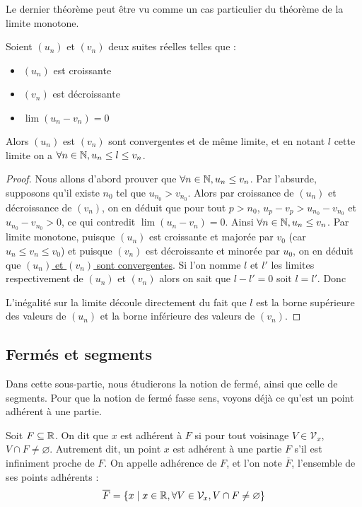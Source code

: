 Le dernier théorème peut être vu comme un cas particulier du théorème de la limite monotone.

\begin{them}
    Soient $(u_n)$ et $(v_n)$ deux suites réelles telles que :
    \begin{itemize}[label=$\bullet$]
        \item $(u_n)$ est croissante
        \item $(v_n)$ est décroissante
        \item $\lim (u_n-v_n) = 0$
    \end{itemize}
    Alors $(u_n)$ est $(v_n)$ sont convergentes et de même limite, et en notant $l$ cette limite on a $\forall n\in\mathbb{N}, u_n \leq l \leq v_n$.
\end{them}

\begin{proof}
    Nous allons d'abord prouver que $\forall n\in\mathbb{N},u_n \leq v_n$. Par l'absurde, supposons qu'il existe $n_0$ tel que $u_{n_0} > v_{n_0}$. Alors par croissance de $(u_n)$ et décroissance de $(v_n)$, on en déduit que pour tout $p > n_0$, $u_p-v_p > u_{n_0}-v_{n_0}$ et $u_{n_0}-v_{n_0} > 0$, ce qui contredit $\lim (u_n-v_n) = 0$. Ainsi $\forall n\in\mathbb{N},u_n \leq v_n$. Par limite monotone, puisque $(u_n)$ est croissante et majorée par $v_0$ (car $u_n \leq v_n \leq v_0$) et puisque $(v_n)$ est décroissante et minorée par $u_0$, on en déduit que \underline{$(u_n)$ et $(v_n)$ sont convergentes}. Si l'on nomme $l$ et $l'$ les limites respectivement de $(u_n)$ et $(v_n)$ alors on sait que $l-l'=0$ soit $l=l'$. Donc 

    L'inégalité sur la limite découle directement du fait que $l$ est la borne supérieure des valeurs de $(u_n)$ et la borne inférieure des valeurs de $(v_n)$.
\end{proof}

\subsection{Fermés et segments}

Dans cette sous-partie, nous étudierons la notion de fermé, ainsi que celle de segments. Pour que la notion de fermé fasse sens, voyons déjà ce qu'est un point adhérent à une partie.

\begin{defi}[Adhérence]
    Soit $F\subseteq \mathbb{R}$. On dit que $x$ est adhérent à $F$ si pour tout voisinage $V\in\mathcal V_x$, $V\cap F \neq \varnothing$. Autrement dit, un point $x$ est adhérent à une partie $F$ s'il est infiniment proche de $F$. On appelle adhérence de $F$, et l'on note $\overline F$, l'ensemble de ses points adhérents : $$\overline F = \{x\;|\;x\in\mathbb{R}, \forall V\in\mathcal V_x, V\cap F \neq \varnothing\}$$
\end{defi}

